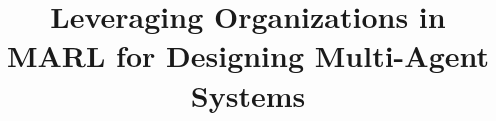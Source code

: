 \documentclass[runningheads]{llncs}
\begin{document}
\title{Leveraging Organizations in MARL for Designing Multi-Agent Systems}
%

%

\author{}
\authorrunning{}
\institute{}


\maketitle              %

\end{document}
